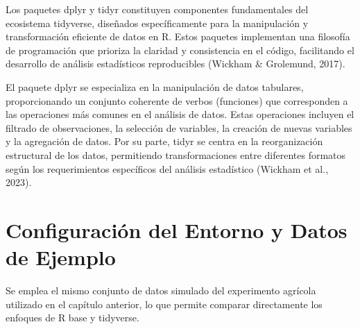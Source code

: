 \documentclass[
  spanish,
  a4paper,
  DIV=11,
  numbers=noendperiod,
  onepage,
  openany]{scrreprt}
\begin{document}
Los paquetes dplyr y tidyr constituyen componentes fundamentales del
ecosistema tidyverse, diseñados específicamente para la manipulación y
transformación eficiente de datos en R. Estos paquetes implementan una
filosofía de programación que prioriza la claridad y consistencia en el
código, facilitando el desarrollo de análisis estadísticos reproducibles
(Wickham \& Grolemund, 2017).

El paquete dplyr se especializa en la manipulación de datos tabulares,
proporcionando un conjunto coherente de verbos (funciones) que
corresponden a las operaciones más comunes en el análisis de datos.
Estas operaciones incluyen el filtrado de observaciones, la selección de
variables, la creación de nuevas variables y la agregación de datos. Por
su parte, tidyr se centra en la reorganización estructural de los datos,
permitiendo transformaciones entre diferentes formatos según los
requerimientos específicos del análisis estadístico (Wickham et al.,
2023).

\section{Configuración del Entorno y Datos de
Ejemplo}\label{configuraciuxf3n-del-entorno-y-datos-de-ejemplo}

Se emplea el mismo conjunto de datos simulado del experimento agrícola
utilizado en el capítulo anterior, lo que permite comparar directamente
los enfoques de R base y tidyverse.
\end{document}
